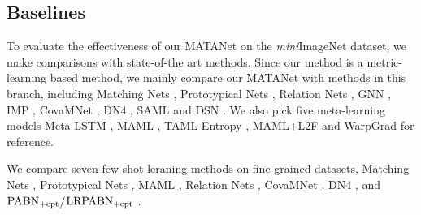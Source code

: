 \documentclass[final]{cvpr}
\begin{document}
	
	
	
	\subsection{Baselines}
	To evaluate the effectiveness of our MATANet on the \emph{mini}ImageNet dataset, we make comparisons with state-of-the art methods. Since our method is a metric-learning based method, we mainly compare our MATANet with methods in this branch, including Matching Nets \cite{vinyals2016matching}, Prototypical Nets \cite{snell2017prototypical}, Relation Nets \cite{sung2018learning}, GNN \cite{garcia2017few}, IMP \cite{allen2019infinite}, CovaMNet \cite{li2019distribution}, DN4 \cite{li2019revisiting}, SAML\cite{hao2019collect} and DSN \cite{simon2020adaptive} . We also pick five meta-learning models Meta LSTM \cite{ravi2016optimization}, MAML \cite{finn2017model}, TAML-Entropy \cite{jamal2019task}, MAML+L2F \cite{baik2020learning} and WarpGrad \cite{flennerhag2019meta} for reference. 
	
	We compare seven few-shot leraning methods on fine-grained datasets, Matching Nets \cite{vinyals2016matching}, Prototypical Nets \cite{snell2017prototypical}, MAML \cite{finn2017model}, Relation Nets  \cite{sung2018learning}, CovaMNet \cite{li2019distribution}, DN4 \cite{li2019revisiting}, and $\rm {PABN_{+cpt}}$/$\rm {LRPABN_{+cpt}}$ \cite{huang2020low}. 
	
	
	
\end{document}
